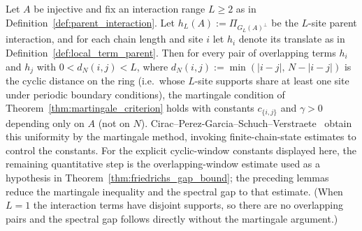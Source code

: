 \begin{lemma}\label{lem:martingale_mps}
    \notready
    Let $A$ be injective and fix an interaction range $L \ge 2$ as in
    Definition~\ref{def:parent_interaction}. Let $h_L(A) := \Pi_{G_L(A)^\perp}$
    be the $L$-site parent interaction, and for each chain length and site $i$
    let $h_i$ denote its translate as in Definition~\ref{def:local_term_parent}.
    Then for every pair of overlapping terms $h_i$ and $h_j$ with
    $0 < d_N(i,j) < L$, where $d_N(i,j) := \min(|i-j|,\, N-|i-j|)$ is the
    cyclic distance on the ring (i.e.\ whose $L$-site supports share at
    least one site under periodic boundary conditions),
    the martingale condition of Theorem~\ref{thm:martingale_criterion} holds with
    constants $c_{\{i,j\}}$ and $\gamma > 0$ depending only on $A$ (not on $N$).
    Cirac--Perez-Garcia--Schuch--Verstraete~\cite[Section~IV.C]{Cirac2021Matrix}
    obtain this uniformity by the martingale method, invoking finite-chain-state
    estimates to control the constants. For the explicit cyclic-window
    constants displayed here, the remaining quantitative step is the
    overlapping-window estimate used as a hypothesis in
    Theorem~\ref{thm:friedrichs_gap_bound}; the preceding lemmas reduce the
    martingale inequality and the spectral gap to that estimate.
    (When $L = 1$ the interaction terms have disjoint supports, so there are no
    overlapping pairs and the spectral gap follows directly without the
    martingale argument.)
\end{lemma}

